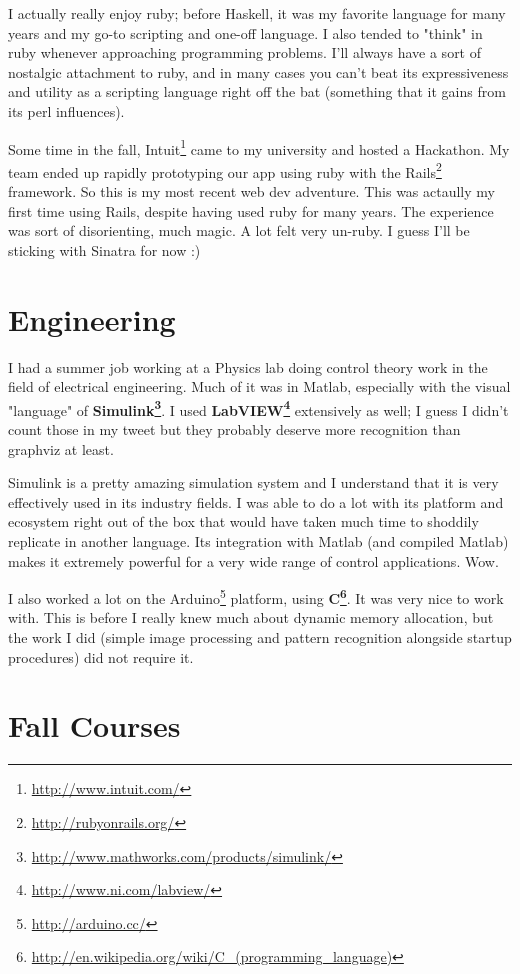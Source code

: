 \documentclass[]{article}
\renewcommand{\href}[2]{#2\footnote{\url{#1}}}
\begin{document}
I actually really enjoy ruby; before Haskell, it was my favorite language for
many years and my go-to scripting and one-off language. I also tended to "think"
in ruby whenever approaching programming problems. I'll always have a sort of
nostalgic attachment to ruby, and in many cases you can't beat its
expressiveness and utility as a scripting language right off the bat (something
that it gains from its perl influences).

Some time in the fall, \href{http://www.intuit.com/}{Intuit} came to my
university and hosted a Hackathon. My team ended up rapidly prototyping our app
using ruby with the \href{http://rubyonrails.org/}{Rails} framework. So this is
my most recent web dev adventure. This was actaully my first time using Rails,
despite having used ruby for many years. The experience was sort of
disorienting, much magic. A lot felt very un-ruby. I guess I'll be sticking with
Sinatra for now :)

\section{Engineering}

I had a summer job working at a Physics lab doing control theory work in the
field of electrical engineering. Much of it was in Matlab, especially with the
visual "language" of
\textbf{\href{http://www.mathworks.com/products/simulink/}{Simulink}}. I used
\textbf{\href{http://www.ni.com/labview/}{LabVIEW}} extensively as well; I guess
I didn't count those in my tweet but they probably deserve more recognition than
graphviz at least.

Simulink is a pretty amazing simulation system and I understand that it is very
effectively used in its industry fields. I was able to do a lot with its
platform and ecosystem right out of the box that would have taken much time to
shoddily replicate in another language. Its integration with Matlab (and
compiled Matlab) makes it extremely powerful for a very wide range of control
applications. Wow.

I also worked a lot on the \href{http://arduino.cc/}{Arduino} platform, using
\textbf{\href{http://en.wikipedia.org/wiki/C_(programming_language)}{C}}. It was
very nice to work with. This is before I really knew much about dynamic memory
allocation, but the work I did (simple image processing and pattern recognition
alongside startup procedures) did not require it.

\section{Fall Courses}
\end{document}

